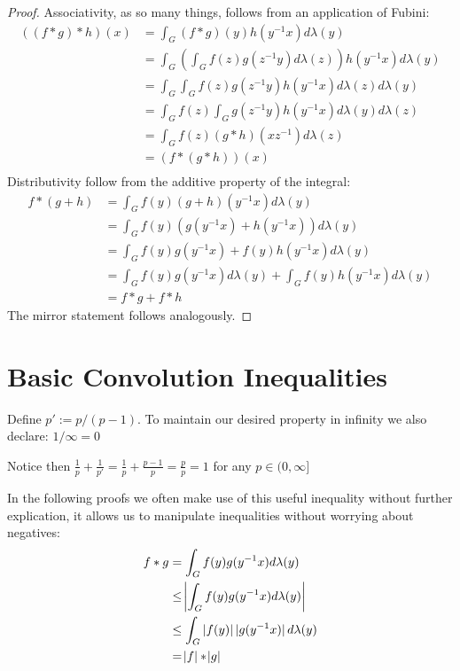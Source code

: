 \begin{proof}
Associativity, as so many things, follows from an application of Fubini:
\begin{align*}
((f \ast g) \ast  h )(x) &= \int_G (f \ast g)(y) h(y^{-1}x) d\lambda(y) \\
&= \int_G ( \int_G f(z)g(z^{-1}y)d\lambda(z)) h(y^{-1}x)d\lambda(y) \\
&= \int_G  \int_G f(z)g(z^{-1}y) h(y^{-1}x)d\lambda(z) d\lambda(y) \\
&= \int_G  f(z) \int_G g(z^{-1}y) h(y^{-1}x)d\lambda(y) d\lambda(z) \\
&= \int_G  f(z) (g \ast h)(xz^{-1}) d\lambda(z) \\
&= (f \ast (g \ast  h ))(x) \\
\end{align*}
Distributivity follow from the additive property of the integral:
\begin{align*}
f \ast (g + h) &= \int_G f(y) (g+h)(y^{-1}x)d\lambda(y)\\
&= \int_G f(y) (g(y^{-1}x)+h(y^{-1}x))d\lambda(y)\\
&= \int_G f(y)g(y^{-1}x)+f(y)h(y^{-1}x)d\lambda(y)\\
&= \int_G f(y)g(y^{-1}x) d\lambda(y) + \int_G f(y)h(y^{-1}x) d\lambda(y)\\
&= f \ast g + f \ast h
\end{align*}
The mirror statement follows analogously. 
\end{proof}

\section{Basic Convolution Inequalities}

\begin{definition}
Define $ p' := p / (p-1) $. To maintain our desired property in infinity we also declare: $1 / \infty = 0$
\end{definition}

\begin{remark}
Notice then $\frac{1}{p} + \frac{1}{p'} = \frac{1}{p} + \frac{p-1}{p} = \frac{p}{p} = 1$ for any $p \in (0,\infty]$
\end{remark}

\begin{remark}
In the following proofs we often make use of this useful inequality without further explication, it allows us to manipulate inequalities without worrying about negatives:
\begin{align*}
f \ast g &= \int_G f(y)g(y^{-1}x) d\lambda(y) \\
&\leq \abs{ \int_G f(y)g(y^{-1}x) d\lambda(y) } \\
&\leq \int_G \abs[0]{f(y)}\abs[0]{g(y^{-1}x)} d\lambda(y) \\
&= \abs{f} \ast \abs{g}
\end{align*}
\end{remark}


